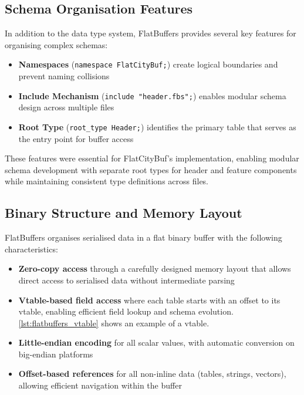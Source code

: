 \subsection{Schema Organisation Features}
\label{tb:flatbuffers:schema_organisation}

In addition to the data type system, FlatBuffers provides several key features for organising complex schemas:

\begin{itemize}
  \item \textbf{Namespaces} (\texttt{namespace FlatCityBuf;}) create logical boundaries and prevent naming collisions

  \item \textbf{Include Mechanism} (\texttt{include "header.fbs";}) enables modular schema design across multiple files

  \item \textbf{Root Type} (\texttt{root\_type Header;}) identifies the primary table that serves as the entry point for buffer access
\end{itemize}

These features were essential for FlatCityBuf's implementation, enabling modular schema development with separate root types for header and feature components while maintaining consistent type definitions across files.

\subsection{Binary Structure and Memory Layout}
\label{tb:flatbuffers:binary_structure}

FlatBuffers organises serialised data in a flat binary buffer with the following characteristics:

\begin{itemize}
  \item \textbf{Zero-copy access} through a carefully designed memory layout that allows direct access to serialised data without intermediate parsing
  \item \textbf{Vtable-based field access} where each table starts with an offset to its vtable, enabling efficient field lookup and schema evolution. \autoref{lst:flatbuffers_vtable} shows an example of a vtable.
  \item \textbf{Little-endian encoding} for all scalar values, with automatic conversion on big-endian platforms
  \item \textbf{Offset-based references} for all non-inline data (tables, strings, vectors), allowing efficient navigation within the buffer
\end{itemize}

